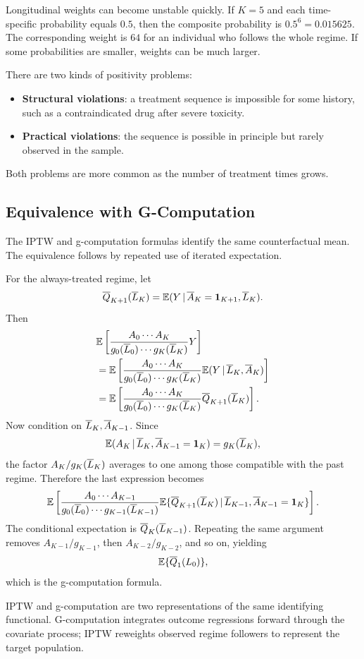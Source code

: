 Longitudinal weights can become unstable quickly. If $K=5$ and each
time-specific probability equals $0.5$, then the composite probability is
$0.5^6=0.015625$. The corresponding weight is $64$ for an individual who
follows the whole regime. If some probabilities are smaller, weights can be much
larger.

There are two kinds of positivity problems:
\begin{itemize}
  \item \textbf{Structural violations}: a treatment sequence is impossible for
  some history, such as a contraindicated drug after severe toxicity.
  \item \textbf{Practical violations}: the sequence is possible in principle but
  rarely observed in the sample.
\end{itemize}
Both problems are more common as the number of treatment times grows.

\subsection{Equivalence with G-Computation}

The IPTW and g-computation formulas identify the same counterfactual mean. The
equivalence follows by repeated use of iterated expectation.

For the always-treated regime, let
\[
  \overline{Q}_{K+1}(\overline{L}_K)=\mathbb{E}(Y\,\vert\, \overline{A}_K=\mathbf{1}_{K+1},\overline{L}_K).
\]
Then
\[
\begin{aligned}
&\mathbb{E}\left[
  \frac{A_0\cdots A_K}{g_0(\overline{L}_0)\cdots g_K(\overline{L}_K)}Y
\right] \\
&=
\mathbb{E}\left[
  \frac{A_0\cdots A_K}{g_0(\overline{L}_0)\cdots g_K(\overline{L}_K)}
  \mathbb{E}(Y\,\vert\, \overline{L}_K,\overline{A}_K)
\right] \\
&=
\mathbb{E}\left[
  \frac{A_0\cdots A_K}{g_0(\overline{L}_0)\cdots g_K(\overline{L}_K)}
  \overline{Q}_{K+1}(\overline{L}_K)
\right].
\end{aligned}
\]
Now condition on $\overline{L}_K,\overline{A}_{K-1}$. Since
\[
  \mathbb{E}(A_K\,\vert\, \overline{L}_K,\overline{A}_{K-1}=\mathbf{1}_K)=g_K(\overline{L}_K),
\]
the factor $A_K/g_K(\overline{L}_K)$ averages to one among those compatible with the
past regime. Therefore the last expression becomes
\[
  \mathbb{E}\left[
  \frac{A_0\cdots A_{K-1}}{g_0(\overline{L}_0)\cdots g_{K-1}(\overline{L}_{K-1})}
  \mathbb{E}\{\overline{Q}_{K+1}(\overline{L}_K)\,\vert\, \overline{L}_{K-1},\overline{A}_{K-1}=\mathbf{1}_K\}
  \right].
\]
The conditional expectation is $\overline{Q}_K(\overline{L}_{K-1})$. Repeating the same
argument removes $A_{K-1}/g_{K-1}$, then $A_{K-2}/g_{K-2}$, and so on, yielding
\[
  \mathbb{E}\{\overline{Q}_1(L_0)\},
\]
which is the g-computation formula.

\begin{keyidea}
IPTW and g-computation are two representations of the same identifying
functional. G-computation integrates outcome regressions forward through the
covariate process; IPTW reweights observed regime followers to represent the
target population.
\end{keyidea}
